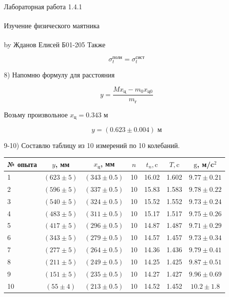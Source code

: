 \documentclass{astroedu-lab}
\begin{document}
\begin{problem}{\huge Лабораторная работа 1.4.1\\\\Изучение физического маятника\\\\by Жданов Елисей Б01-205}
Также

\begin{equation}
	\sigma_{t}^{\text {полн}} = \sigma_{t}^{\text {сист}}
\end{equation}

8) Напомню формулу для расстояния

\begin{equation}
	y=\frac{M x_{\text{ц}}-m_{0} x_{\text{ц} 0}}{m_{\text{г}}}
\end{equation}

Возьму произвольное $x_{\text{ц}} = 0.343 \text{ м}$

\begin{equation}
	y = (0.623 \pm 0.004) \text{ м}
\end{equation}

9-10) Составлю таблицу из 10 измерений по 10 колебаний.

\begin{center}
\begin{tabular}{|l|c|c|c|c|c|c|}
\hline № опыта & \(y\), мм & \(x_{\text {ц}}\), мм  & \(n\) & \(t_{n}, \mathrm{c}\) & \(T, \mathrm{c}\) & \(\mathrm{g}\), м/c$^2$ \\ \hline
1 & $(623 \pm 5)$ & $(343 \pm 0.5)$ & 10 & 16.02 & 1.602 & $9.77 \pm 0.21$ \\ \hline
2 & $(596 \pm 5)$ & $(337 \pm 0.5)$ & 10 & 15.83 & 1.583 & $9.78 \pm 0.22$ \\ \hline
3 & $(540 \pm 5)$ & $(324 \pm 0.5)$ & 10 & 15.52 & 1.552 & $9.73 \pm 0.24$ \\ \hline
4 & $(483 \pm 5)$ & $(311 \pm 0.5)$ & 10 & 15.17 & 1.517 & $9.75 \pm 0.26$ \\ \hline
5 & $(417 \pm 5)$ & $(296 \pm 0.5)$ & 10 & 14.87 & 1.487 & $9.71 \pm 0.29$ \\ \hline
6 & $(343 \pm 5)$ & $(279 \pm 0.5)$ & 10 & 14.57 & 1.457 & $9.73 \pm 0.34$ \\ \hline
7 & $(277 \pm 5)$ & $(264 \pm 0.5)$ & 10 & 14.36 & 1.436 & $9.79 \pm 0.41$ \\ \hline
8 & $(211 \pm 5)$ & $(249 \pm 0.5)$ & 10 & 14.25 & 1.425 & $9.87 \pm 0.51$ \\ \hline
9 & $(151 \pm 5)$ & $(235 \pm 0.5)$ & 10 & 14.27 & 1.427 & $9.96 \pm 0.69$ \\ \hline
10 & $(55 \pm 4)$ & $(213 \pm 0.5)$ & 10 & 14.52 & 1.452 & $10.2 \pm 1.8$ \\ \hline
\end{tabular}
\end{center}


\end{problem}
\end{document}
